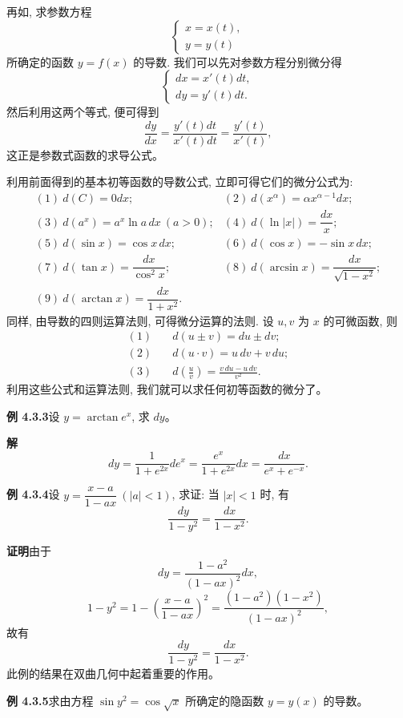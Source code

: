 \documentclass[UTF8,12pt,a4paper,fontset=fandol]{ctexart}
\begin{document}
再如, 求参数方程
\[
  \begin{cases}
    x=x(t),\\
    y=y(t)
  \end{cases}
\]
所确定的函数 $y=f(x)$ 的导数. 我们可以先对参数方程分别微分得
\[
  \begin{cases}
    dx=x'(t)dt,\\
    dy=y'(t)dt.
  \end{cases}
\]
然后利用这两个等式, 便可得到
\[
  \frac{dy}{dx}
  =
  \frac{y'(t)dt}{x'(t)dt}
  =
  \frac{y'(t)}{x'(t)},
\]
这正是参数式函数的求导公式。

利用前面得到的基本初等函数的导数公式, 立即可得它们的微分公式为:
\[
\begin{array}{ll}
  (1)\ d(C)=0dx; & (2)\ d(x^\alpha)=\alpha x^{\alpha-1}dx;\\[4pt]
  (3)\ d(a^x)=a^x\ln a\,dx\ (a>0); &
  (4)\ d(\ln|x|)=\dfrac{dx}{x};\\[8pt]
  (5)\ d(\sin x)=\cos x\,dx; &
  (6)\ d(\cos x)=-\sin x\,dx;\\[4pt]
  (7)\ d(\tan x)=\dfrac{dx}{\cos^2 x}; &
  (8)\ d(\arcsin x)=\dfrac{dx}{\sqrt{1-x^2}};\\[8pt]
  (9)\ d(\arctan x)=\dfrac{dx}{1+x^2}. &
\end{array}
\]
同样, 由导数的四则运算法则, 可得微分运算的法则. 设 $u,v$ 为 $x$ 的可微函数, 则
\[
\begin{aligned}
  (1)\quad &d(u\pm v)=du\pm dv;\\
  (2)\quad &d(u\cdot v)=u\,dv+v\,du;\\
  (3)\quad &d\left(\frac{u}{v}\right)=\frac{v\,du-u\,dv}{v^2}.
\end{aligned}
\]
利用这些公式和运算法则, 我们就可以求任何初等函数的微分了。

\noindent\textbf{例 4.3.3}\quad 设 $y=\arctan e^x$, 求 $dy$。

\noindent\textbf{解}\quad
\[
  dy
  =
  \frac{1}{1+e^{2x}}de^x
  =
  \frac{e^x}{1+e^{2x}}dx
  =
  \frac{dx}{e^x+e^{-x}}.
\]

\noindent\textbf{例 4.3.4}\quad 设 $y=\dfrac{x-a}{1-ax}\ (|a|<1)$, 求证: 当 $|x|<1$ 时, 有
\[
  \frac{dy}{1-y^2}=\frac{dx}{1-x^2}.
\]

\noindent\textbf{证明}\quad 由于
\[
  dy=\frac{1-a^2}{(1-ax)^2}dx,
\]
\[
  1-y^2
  =
  1-\left(\frac{x-a}{1-ax}\right)^2
  =
  \frac{(1-a^2)(1-x^2)}{(1-ax)^2},
\]
故有
\[
  \frac{dy}{1-y^2}=\frac{dx}{1-x^2}.
\]
此例的结果在双曲几何中起着重要的作用。

\noindent\textbf{例 4.3.5}\quad 求由方程 $\sin y^2=\cos\sqrt{x}$ 所确定的隐函数 $y=y(x)$ 的导数。
\end{document}
